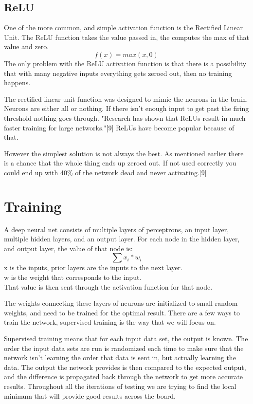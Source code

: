 \documentclass{article}
\begin{document}
\subsection{ReLU}
One of the more common, and simple activation function is the Rectified Linear Unit.
The ReLU function takes the value passed in, the computes the max of that value and zero.
\[f(x) = max(x, 0)\]
The only problem with the ReLU activation function is that there is a possibility that with many negative inputs everything gets zeroed out, then no training happens.

The rectified linear unit function was designed to mimic the neurons in the brain.
Neurons are either all or nothing. 
If there isn't enough input to get past the firing threshold nothing goes through.
"Research has shown that ReLUs result in much faster training for large networks."[9]
ReLUs have become popular because of that.

However the simplest solution is not always the best.
As mentioned earlier there is a chance that the whole thing ends up zeroed out.
If not used correctly you could end up with 40\% of the network dead and never activating.[9]

\section{Training}

A deep neural net consists of multiple layers of perceptrons, an input layer, multiple hidden layers, and an output layer.
For each node in the hidden layer, and output layer, the value of that node is:
\[\sum x_i * w_i\]
x is the inputs, prior layers are the inputs to the next layer. \\
w is the weight that corresponds to the input. \\
That value is then sent through the activation function for that node.

The weights connecting these layers of neurons are initialized to small random weights, and need to be trained for the optimal result.
There are a few ways to train the network, supervised training is the way that we will focus on. 

Supervised training means that for each input data set, the output is known.
The order the input data sets are run is randomized each time to make sure that the network isn't learning the order that data is sent in, but actually learning the data.
The output the network provides is then compared to the expected output, and the difference is propagated back through the network to get more accurate results.
Throughout all the iterations of testing we are trying to find the local minimum that will provide good results across the board.
\end{document}
